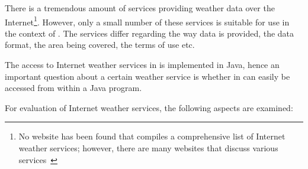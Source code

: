 There is a tremendous amount of services providing weather data over the Internet\footnote{No website has been found that compiles a comprehensive list of Internet weather services; however, there are many websites that discuss various services~\cite{WeatherServices1,WeatherServices2,WeatherServices3}}. However, only a small number of these services is suitable for use in the context of \smarthomeweather. The services differ regarding the way data is provided, the data format, the area being covered, the terms of use etc.

The access to Internet weather services in \smarthomeweather is implemented in Java, hence an important question about a certain weather service is whether in can easily be accessed from within a Java program.

For evaluation of Internet weather services, the following aspects are examined:

